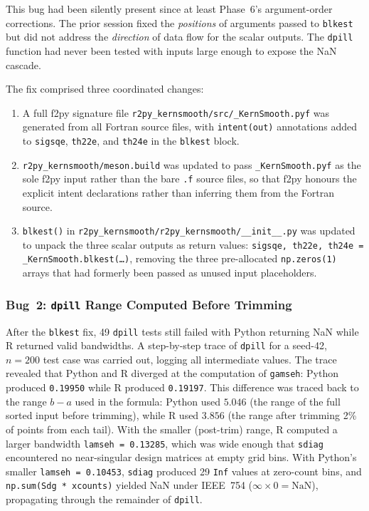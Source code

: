 \documentclass[12pt,a4paper]{article}
\begin{document}
This bug had been silently present since at least Phase~6's argument-order corrections. The prior session fixed the \emph{positions} of arguments passed to \texttt{blkest} but did not address the \emph{direction} of data flow for the scalar outputs. The \texttt{dpill} function had never been tested with inputs large enough to expose the NaN cascade.

The fix comprised three coordinated changes:

\begin{enumerate}
  \item A full f2py signature file \texttt{r2py\_kernsmooth/src/\_KernSmooth.pyf} was generated from all Fortran source files, with \texttt{intent(out)} annotations added to \texttt{sigsqe}, \texttt{th22e}, and \texttt{th24e} in the \texttt{blkest} block.
  \item \texttt{r2py\_kernsmooth/meson.build} was updated to pass \texttt{\_KernSmooth.pyf} as the sole f2py input rather than the bare \texttt{.f} source files, so that f2py honours the explicit intent declarations rather than inferring them from the Fortran source.
  \item \texttt{blkest()} in \texttt{r2py\_kernsmooth/r2py\_kernsmooth/\_\_init\_\_.py} was updated to unpack the three scalar outputs as return values: \texttt{sigsqe, th22e, th24e = \_KernSmooth.blkest(\ldots)}, removing the three pre-allocated \texttt{np.zeros(1)} arrays that had formerly been passed as unused input placeholders.
\end{enumerate}

\subsubsection{Bug~2: \texttt{dpill} Range Computed Before Trimming}

After the \texttt{blkest} fix, 49 \texttt{dpill} tests still failed with Python returning NaN while R returned valid bandwidths. A step-by-step trace of \texttt{dpill} for a seed-42, $n=200$ test case was carried out, logging all intermediate values. The trace revealed that Python and R diverged at the computation of \texttt{gamseh}: Python produced \texttt{0.19950} while R produced \texttt{0.19197}. This difference was traced back to the range $b - a$ used in the formula: Python used $5.046$ (the range of the full sorted input before trimming), while R used $3.856$ (the range after trimming 2\% of points from each tail). With the smaller (post-trim) range, R computed a larger bandwidth \texttt{lamseh = 0.13285}, which was wide enough that \texttt{sdiag} encountered no near-singular design matrices at empty grid bins. With Python's smaller \texttt{lamseh = 0.10453}, \texttt{sdiag} produced 29 \texttt{Inf} values at zero-count bins, and \texttt{np.sum(Sdg * xcounts)} yielded NaN under IEEE~754 ($\infty \times 0 = \mathrm{NaN}$), propagating through the remainder of \texttt{dpill}.
\end{document}
